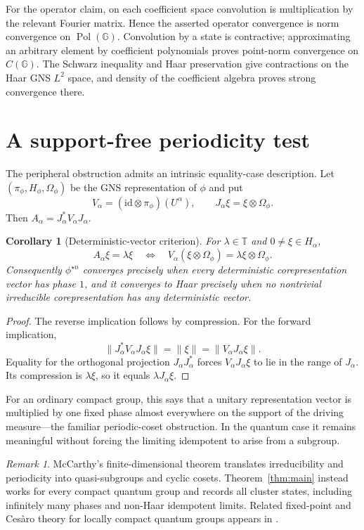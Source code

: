 \documentclass[11pt]{article}
\newtheorem{corollary}{Corollary}
\theoremstyle{remark}
\newtheorem{remark}{Remark}
\newcommand{\T}{\mathbb T}
\newcommand{\Pol}{\operatorname{Pol}}
\newcommand{\id}{\mathrm{id}}
\begin{document}
For the operator claim, on each coefficient space convolution is multiplication
by the relevant Fourier matrix.  Hence the asserted operator convergence is
norm convergence on $\Pol(\mathbb G)$.  Convolution by a state is contractive;
approximating an arbitrary element by coefficient polynomials proves
point-norm convergence on $C(\mathbb G)$.  The Schwarz inequality and Haar
preservation give contractions on the Haar GNS $L^2$ space, and density of the
coefficient algebra proves strong convergence there.

\section{A support-free periodicity test}

The peripheral obstruction admits an intrinsic equality-case description.
Let $(\pi_\phi,H_\phi,\Omega_\phi)$ be the GNS representation of $\phi$ and
put
\[
 V_\alpha=(\id\otimes\pi_\phi)(U^\alpha),\qquad
 J_\alpha\xi=\xi\otimes\Omega_\phi.
\]
Then $A_\alpha=J_\alpha^*V_\alpha J_\alpha$.

\begin{corollary}[Deterministic-vector criterion]\label{cor:gns}
For $\lambda\in\T$ and $0\ne\xi\in H_\alpha$,
\[
 A_\alpha\xi=\lambda\xi
 \quad\Longleftrightarrow\quad
 V_\alpha(\xi\otimes\Omega_\phi)
 =\lambda\xi\otimes\Omega_\phi.
\]
Consequently $\phi^{\star n}$ converges precisely when every deterministic
corepresentation vector has phase $1$, and it converges to Haar precisely
when no nontrivial irreducible corepresentation has any deterministic vector.
\end{corollary}

\begin{proof}
The reverse implication follows by compression.  For the forward implication,
\[
 \|J_\alpha^*V_\alpha J_\alpha\xi\|=\|\xi\|
 =\|V_\alpha J_\alpha\xi\|.
\]
Equality for the orthogonal projection $J_\alpha J_\alpha^*$ forces
$V_\alpha J_\alpha\xi$ to lie in the range of $J_\alpha$.  Its compression is
$\lambda\xi$, so it equals $\lambda J_\alpha\xi$.
\end{proof}

For an ordinary compact group, this says that a unitary representation vector
is multiplied by one fixed phase almost everywhere on the support of the
driving measure---the familiar periodic-coset obstruction.  In the quantum
case it remains meaningful without forcing the limiting idempotent to arise
from a subgroup.

\begin{remark}
McCarthy's finite-dimensional theorem \cite{McC} translates irreducibility and
periodicity into quasi-subgroups and cyclic cosets.  Theorem~\ref{thm:main}
instead works for every compact quantum group and records all cluster states,
including infinitely many phases and non-Haar idempotent limits.  Related
fixed-point and Ces\`aro theory for locally compact quantum groups appears in
\cite{NSSS}.
\end{remark}
\end{document}
